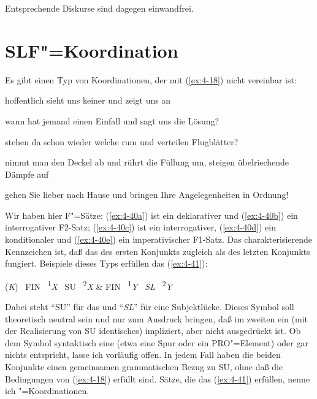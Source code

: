 \documentclass[output=paper]{langsci/langscibook}
\begin{document}
\begin{exe}
\end{exe}
Entsprechende Diskurse sind dagegen einwandfrei.

\section{SLF"=Koordination}%
\label{sec:4-3}

\ssubsection{}%
\label{subsec:4-3-1}
Es gibt einen Typ von Koordinationen, der mit (\ref{ex:4-18}) nicht vereinbar ist:

\begin{exe}
\ex
\label{ex:4-40}
\begin{xlist}
\ex%
\label{ex:4-40a}
hoffentlich sieht uns keiner und zeigt uns an

\ex%
\label{ex:4-40b}
wann hat jemand einen Einfall und sagt uns die Lösung?

\ex%
\label{ex:4-40c}
stehen da schon wieder welche rum und verteilen Flugblätter?

\ex%
\label{ex:4-40d}
nimmt man den Deckel ab und rührt die Füllung um, steigen übelriechende Dämpfe auf

\ex%
\label{ex:4-40e}
gehen Sie lieber nach Hause und bringen Ihre Angelegenheiten in Ordnung!
\end{xlist}
\end{exe}
Wir haben hier F"=Sätze: (\ref{ex:4-40a}) ist ein deklarativer und (\ref{ex:4-40b}) ein interrogativer F2-Satz; (\ref{ex:4-40c}) ist ein interrogativer, (\ref{ex:4-40d}) ein konditionaler und (\ref{ex:4-40e}) ein imperativischer F1-Satz. Das charakterisierende Kennzeichen ist, daß das  des ersten Konjunkts zugleich als  des letzten Konjunkts fungiert. Beispiele dieses Typs erfüllen das  (\ref{ex:4-41}):


\begin{exe}
\ex%
\label{ex:4-41}
(\textit{K}) \ FIN \ \textsuperscript{1}\textit{X} \ SU \ \textsuperscript{2}\textit{X} \quad \& \quad FIN \ \textsuperscript{1}\textit{Y} \ \textit{SL} \ \textsuperscript{2}\textit{Y}
\end{exe}
Dabei steht "`SU"' für das  und "`\textit{SL}"' für eine Subjektlücke. Dieses Symbol soll theoretisch neutral sein und nur zum Ausdruck bringen, daß im zweiten  ein (mit der Realisierung von SU identisches)  impliziert, aber nicht ausgedrückt ist. Ob dem Symbol syntaktisch eine  (etwa eine Spur oder ein PRO"=Element) oder gar nichts entspricht, lasse ich vorläufig offen. In jedem Fall haben die beiden Konjunkte einen gemeinsamen grammatischen Bezug zu SU, ohne daß die Bedingungen von (\ref{ex:4-18}) erfüllt sind. Sätze, die das  (\ref{ex:4-41}) erfüllen, nenne ich "=Koordinationen.
\end{document}
